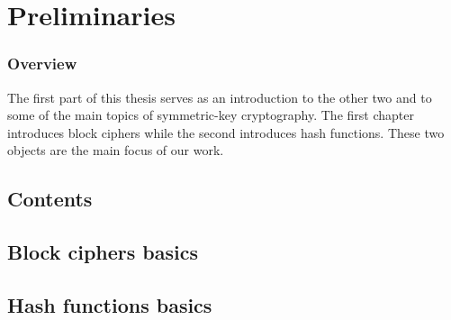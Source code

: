 \part[Préliminaires]
	{Preliminaries}
\label{part:prolego}

\section*{Overview}

The first part of this thesis serves as an introduction to the other two and to some of the
main topics of symmetric-key cryptography. The first chapter introduces block ciphers
while the second introduces hash functions. These two objects are the main focus of our work.



\cleardoublepage
\chapter*{Contents}
\parttoc


\chapter[Introduction aux chiffres par bloc]{Block ciphers basics}
\label{cha:block_intro}



\chapter[Introduction aux fonctions de hachage]{Hash functions basics}
\label{chap:hashfun}

